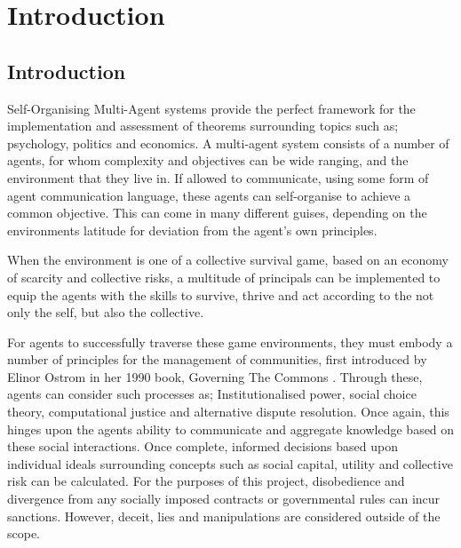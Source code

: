 \chapter{Introduction}\label{introduction}

\section{Introduction}\label{sec:intro}
Self-Organising Multi-Agent systems provide the perfect framework for the implementation and assessment of theorems surrounding topics such as; psychology, politics and economics. A multi-agent system consists of a number of agents, for whom complexity and objectives can be wide ranging, and the environment that they live in. If allowed to communicate, using some form of agent communication language, these agents can self-organise to achieve a common objective. This can come in many different guises, depending on the environments latitude for deviation from the agent's own principles. 

When the environment is one of a collective survival game, based on an economy of scarcity and collective risks, a multitude of principals can be implemented to equip the agents with the skills to survive, thrive and act according to the not only the self, but also the collective. 

For agents to successfully traverse these game environments, they must embody a number of principles for the management of communities, first introduced by Elinor Ostrom in her 1990 book, Governing The Commons \cite{ostrom2015governing}. Through these, agents can consider such processes as; Institutionalised power, social choice theory, computational justice and alternative dispute resolution. Once again, this hinges upon the agents ability to communicate and aggregate knowledge based on these social interactions. Once complete, informed decisions based upon individual ideals surrounding concepts such as social capital, utility and collective risk can be calculated.
For the purposes of this project, disobedience and divergence from any socially imposed contracts or governmental rules can incur sanctions. However, deceit, lies and manipulations are considered outside of the scope. 

